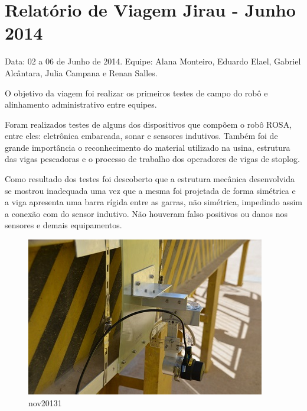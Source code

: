 \section{Relatório de Viagem Jirau - Junho 2014}
Data: 02 a 06 de Junho de 2014.
Equipe: Alana Monteiro, Eduardo Elael, Gabriel Alcântara, Julia Campana e Renan
Salles.

O objetivo da viagem foi realizar os primeiros testes de campo do robô e
alinhamento administrativo entre equipes.

Foram realizados testes de alguns dos dispositivos que compõem o
robô ROSA, entre eles: eletrônica embarcada, sonar e sensores indutivos. Também
foi de grande importância o reconhecimento do material utilizado na usina,
estrutura das vigas pescadoras e o processo de trabalho dos operadores de vigas
de stoplog.

Como resultado dos testes foi descoberto que a estrutura mecânica desenvolvida
se mostrou inadequada uma vez que a mesma foi projetada de forma simétrica e a
viga apresenta uma barra rígida entre as garras, não simétrica, impedindo assim
a conexão com do sensor indutivo. Não houveram falso positivos ou danos nos
sensores e demais equipamentos.

\begin{figure}[h!]
\centering
  \includegraphics[width=1\linewidth]{Fotos/JirauJunho2014/1.jpg}
  \caption{nov20131}
  \label{nov20131}
\end{figure}

